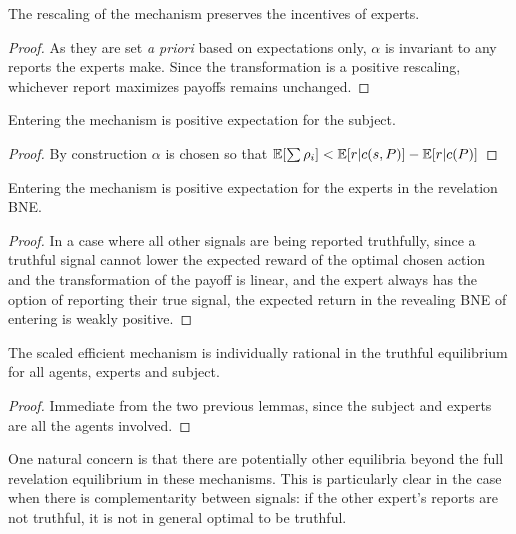 \begin{lem}
	The rescaling of the mechanism preserves the incentives of experts.
\end{lem}

\begin{proof}
	As they are set \emph{a priori} based on expectations only, $\alpha$ is invariant to any reports the experts make. Since the transformation is a positive rescaling, whichever report maximizes payoffs remains unchanged. 
\end{proof}


\begin{lem}
	Entering the mechanism is positive expectation for the subject.
\end{lem}

\begin{proof}
  By construction $\alpha$ is chosen so that $\operatorname*{\mathbb E}[\sum \rho_i] < \operatorname*{\mathbb E}[r|c(s,P)] - \operatorname*{\mathbb E}[r|c(P)]$
\end{proof}


\begin{lem}
	Entering the mechanism is positive expectation for the experts in the revelation BNE.
\end{lem}

\begin{proof}
In a case where all other signals are being reported truthfully, since a truthful signal cannot lower the expected reward of the optimal chosen action and the transformation of the payoff is linear, and the expert always has the option of reporting their true signal, the expected return in the revealing BNE of entering is weakly positive.
\end{proof}


\begin{thm}
	The scaled efficient mechanism is individually rational in the truthful equilibrium for all agents, experts and subject.
\end{thm}

\begin{proof}
Immediate from the two previous lemmas, since the subject and experts are all the agents involved.
\end{proof}

One natural concern is that there are potentially other equilibria beyond the full revelation equilibrium in these mechanisms. This is particularly clear in the case when there is complementarity between signals: if the other expert's reports are not truthful, it is not in general optimal to be truthful.


